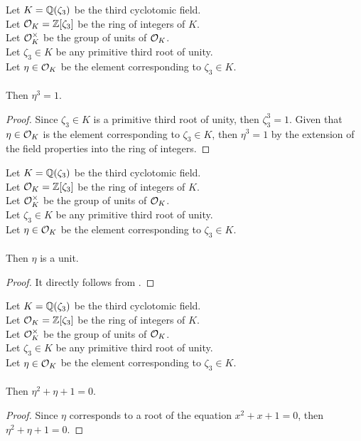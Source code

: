 \begin{lemma}
    \label{lmm:toInteger_cube_eq_one}
    \leanok
    Let $K = \mathbb{Q}(\zeta_3)$ be the third cyclotomic field. \\
    Let $\mathcal{O}_K = \mathbb{Z}[\zeta_3]$ be the ring of integers of $K$. \\
    Let $\mathcal{O}^\times_K$ be the group of units of $\mathcal{O}_K$. \\
    Let $\zeta_3 \in K$ be any primitive third root of unity. \\
    Let $\eta \in \mathcal{O}_K$ be the element corresponding to $\zeta_3 \in K$. \\\\
    Then $\eta^3 = 1$.
\end{lemma}
\begin{proof}
    \leanok
    Since $\zeta_3 \in K$ is a primitive third root of unity, then $\zeta_3^3 = 1$.
    Given that $\eta \in \mathcal{O}_K$ is the element corresponding to $\zeta_3 \in K$, then
    $\eta^3 = 1$ by the extension of the field properties into the ring of integers.
\end{proof}

\begin{lemma}
    \label{lmm:eta_isUnit}
    \leanok
    Let $K = \mathbb{Q}(\zeta_3)$ be the third cyclotomic field. \\
    Let $\mathcal{O}_K = \mathbb{Z}[\zeta_3]$ be the ring of integers of $K$. \\
    Let $\mathcal{O}^\times_K$ be the group of units of $\mathcal{O}_K$. \\
    Let $\zeta_3 \in K$ be any primitive third root of unity. \\
    Let $\eta \in \mathcal{O}_K$ be the element corresponding to $\zeta_3 \in K$. \\\\
    Then $\eta$ is a unit.
\end{lemma}
\begin{proof}
    \leanok
    It directly follows from .
\end{proof}

\begin{lemma}
    \label{lmm:toInteger_eval_cyclo}
    \leanok
    Let $K = \mathbb{Q}(\zeta_3)$ be the third cyclotomic field. \\
    Let $\mathcal{O}_K = \mathbb{Z}[\zeta_3]$ be the ring of integers of $K$. \\
    Let $\mathcal{O}^\times_K$ be the group of units of $\mathcal{O}_K$. \\
    Let $\zeta_3 \in K$ be any primitive third root of unity. \\
    Let $\eta \in \mathcal{O}_K$ be the element corresponding to $\zeta_3 \in K$. \\\\
    Then $\eta^2 + \eta + 1 = 0$.
\end{lemma}
\begin{proof}
    \leanok
    Since $\eta$ corresponds to a root of the equation $x^2 + x + 1 = 0$,
    then $\eta^2 + \eta + 1 = 0$.
\end{proof}

